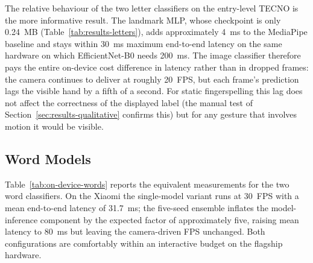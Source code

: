 The relative behaviour of the two letter classifiers on the entry-level
TECNO is the more informative result. The landmark MLP, whose
checkpoint is only \SI{0.24}{MB} (Table~\ref{tab:results-letters}),
adds approximately \SI{4}{ms} to the MediaPipe baseline and stays
within \SI{30}{ms} maximum end-to-end latency on the same hardware on
which EfficientNet-B0 needs \SI{200}{ms}. The image classifier
therefore pays the entire on-device cost difference in latency rather
than in dropped frames: the camera continues to deliver at roughly
\SI{20}{FPS}, but each frame's prediction lags the visible hand by a
fifth of a second. For static fingerspelling this lag does not affect
the correctness of the displayed label (the manual test of
Section~\ref{sec:results-qualitative} confirms this) but for any
gesture that involves motion it would be visible.

\subsection{Word Models}
\label{sec:results-on-device-words}

Table~\ref{tab:on-device-words} reports the equivalent measurements
for the two word classifiers. On the Xiaomi the single-model variant
runs at \SI{30}{FPS} with a mean end-to-end latency of \SI{31.7}{ms};
the five-seed ensemble inflates the model-inference component by the
expected factor of approximately five, raising mean latency to
\SI{80}{ms} but leaving the camera-driven FPS unchanged. Both
configurations are comfortably within an interactive budget on the
flagship hardware.

\begin{table}[!ht]
\centering
\caption{On-device throughput and latency of the two word classifiers.}
\label{tab:on-device-words}
\end{table}

